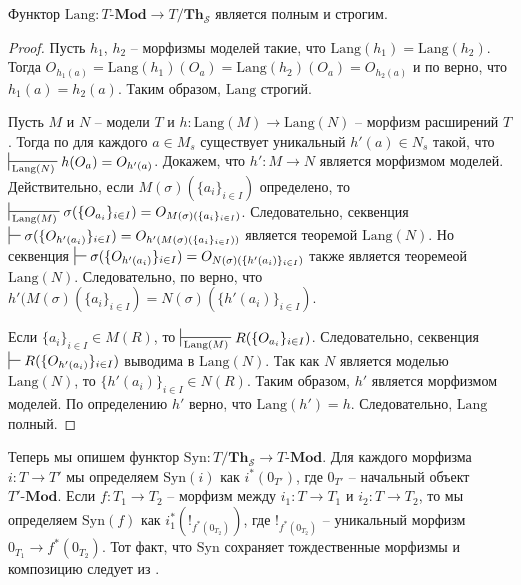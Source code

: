 \documentclass[reqno]{amsart}
\theoremstyle{definition}
\theoremstyle{remark}
\newcommand{\bcat}[1]{\mathbf{#1}}
\newcommand{\Mod}[1]{#1\text{-}\bcat{Mod}}
\newcommand{\fs}[1]{\mathrm{#1}}
\newcommand{\Lang}{\fs{Lang}}
\newcommand{\Syn}{\fs{Syn}}
\newcommand{\Th}{\bcat{Th}}
\begin{document}
\begin{prop}[lang-ff]
Функтор $\Lang : \Mod{T} \to T/\Th_\mathcal{S}$ является полным и строгим.
\end{prop}
\begin{proof}
Пусть $h_1$, $h_2$ -- морфизмы моделей такие, что $\Lang(h_1) = \Lang(h_2)$.
Тогда $O_{h_1(a)} = \Lang(h_1)(O_a) = \Lang(h_2)(O_a) = O_{h_2(a)}$ и по  верно, что $h_1(a) = h_2(a)$.
Таким образом, $\Lang$ строгий.

Пусть $M$ и $N$ -- модели $T$ и $h : \Lang(M) \to \Lang(N)$ -- морфизм расширений $T$.
Тогда по  для каждого $a \in M_s$ существует уникальный $h'(a) \in N_s$ такой, что $\sststile{\Lang(N)}{} h(O_a) = O_{h'(a)}$.
Докажем, что $h' : M \to N$ является морфизмом моделей.
Действительно, если $M(\sigma)(\{ a_i \}_{i \in I})$ определено, то $\sststile{\Lang(M)}{} \sigma(\{ O_{a_i} \}_{i \in I}) = O_{M(\sigma)(\{ a_i \}_{i \in I})}$.
Следовательно, секвенция $\sststile{}{} \sigma(\{ O_{h'(a_i)} \}_{i \in I}) = O_{h'(M(\sigma)(\{ a_i \}_{i \in I}))}$ является теоремой $\Lang(N)$.
Но секвенция $\sststile{}{} \sigma(\{ O_{h'(a_i)} \}_{i \in I}) = O_{N(\sigma)(\{ h'(a_i) \}_{i \in I})}$ также является теоремеой $\Lang(N)$.
Следовательно, по  верно, что $h'(M(\sigma)(\{ a_i \}_{i \in I}) = N(\sigma)(\{ h'(a_i) \}_{i \in I})$.

Если $\{ a_i \}_{i \in I} \in M(R)$, то $\sststile{\Lang(M)}{} R(\{ O_{a_i} \}_{i \in I})$.
Следовательно, секвенция $\sststile{}{} R(\{ O_{h'(a_i)} \}_{i \in I})$ выводима в $\Lang(N)$.
Так как $N$ является моделью $\Lang(N)$, то $\{ h'(a_i) \}_{i \in I} \in N(R)$.
Таким образом, $h'$ является морфизмом моделей.
По определению $h'$ верно, что $\Lang(h') = h$.
Следовательно, $\Lang$ полный.
\end{proof}

Теперь мы опишем функтор $\Syn : T/\Th_\mathcal{S} \to \Mod{T}$.
Для каждого морфизма $i : T \to T'$ мы определяем $\Syn(i)$ как $i^*(0_{T'})$, где $0_{T'}$ -- начальный объект $\Mod{T'}$.
Если $f : T_1 \to T_2$ -- морфизм между $i_1 : T \to T_1$ и $i_2 : T \to T_2$, то мы определяем $\Syn(f)$ как $i_1^*(!_{f^*(0_{T_2})})$, где $!_{f^*(0_{T_2})}$ -- уникальный морфизм $0_{T_1} \to f^*(0_{T_2})$.
Тот факт, что $\Syn$ сохраняет тождественные морфизмы и композицию следует из .
\end{document}
